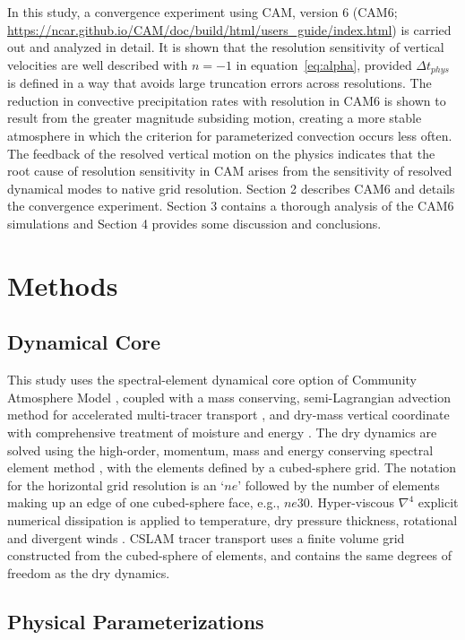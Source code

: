 \documentclass[times]{qjrms4}
\begin{document}
In this study, a convergence experiment using CAM, version 6 (CAM6; \url{https://ncar.github.io/CAM/doc/build/html/users_guide/index.html}) is carried out and analyzed in detail. It is shown that the resolution sensitivity of vertical velocities are well described with $n=-1$ in equation~\eqref{eq:alpha}, provided $\Delta t_{phys}$ is defined in a way that avoids large truncation errors across resolutions. The reduction in convective precipitation rates with resolution in CAM6 is shown to result from the greater magnitude subsiding motion, creating a more stable atmosphere in which the criterion for parameterized convection occurs less often. The feedback of the resolved vertical motion on the physics indicates that the root cause of resolution sensitivity in CAM arises from the sensitivity of resolved dynamical modes to native grid resolution. Section 2 describes CAM6 and details the convergence experiment. Section 3 contains a thorough analysis of the CAM6 simulations and Section 4 provides some discussion and conclusions.

\section{Methods}

\subsection{Dynamical Core}

This study uses the spectral-element dynamical core option of Community Atmosphere Model \citep[CAM-SE;][]{DetAl2012IJHPCA}, coupled with a mass conserving, semi-Lagrangian advection method for accelerated multi-tracer transport \citep[CSLAM;][]{LTOUNGK2017MWR}, and dry-mass vertical coordinate with comprehensive treatment of moisture and energy \citep{LetAl2018JAMES}. The dry dynamics are solved using the high-order, momentum, mass and energy conserving spectral element method \citep{TF2010JCP}, with the elements defined by a cubed-sphere grid. The notation for the horizontal grid resolution is an `$ne$' followed by the number of elements making up an edge of one cubed-sphere face, e.g., $ne30$. Hyper-viscous $\nabla^{4}$ explicit numerical dissipation is applied to temperature, dry pressure thickness, rotational and divergent winds \citep{LetAl2018JAMES}. CSLAM tracer transport uses a finite volume grid constructed from the cubed-sphere of elements, and contains the same degrees of freedom as the dry dynamics.

\subsection{Physical Parameterizations}
\end{document}
